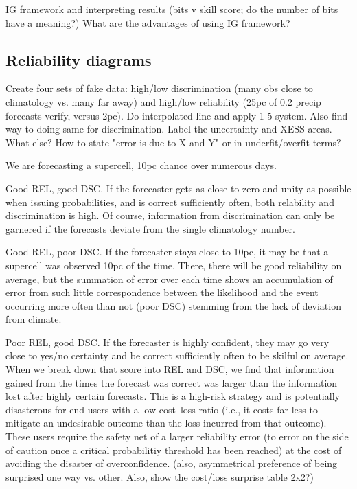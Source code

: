\documentclass[draft]{ametsoc}
\begin{document}
IG framework and interpreting results (bits v skill score; do the number of bits have a meaning?) What are the advantages of using IG framework? 

\subsection{Reliability diagrams}
Create four sets of fake data: high/low discrimination (many obs close to climatology vs. many far away) and high/low reliability (25pc of 0.2 precip forecasts verify, versus 2pc). Do interpolated line and apply 1-5 system. Also find way to doing same for discrimination. Label the uncertainty and XESS areas. What else? How to state "error is due to X and Y" or in underfit/overfit terms?

We are forecasting a supercell, 10pc chance over numerous days. 

Good REL, good DSC. If the forecaster gets as close to zero and unity as possible when issuing probabilities, and is correct sufficiently often, both relability and discrimination is high. Of course, information from discrimination can only be garnered if the forecasts deviate from the single climatology number.

Good REL, poor DSC. If the forecaster stays close to 10pc, it may be that a supercell was observed 10pc of the time. There, there will be good reliability on average, but the summation of error over each time shows an accumulation of error from such little correspondence between the likelihood and the event occurring more often than not (poor DSC) stemming from the lack of deviation from climate.

Poor REL, good DSC. If the forecaster is highly confident, they may go very close to yes/no certainty and be correct sufficiently often to be skilful on average. When we break down that score into REL and DSC, we find that information gained from the times the forecast was correct was larger than the information lost after highly certain forecasts. This is a high-risk strategy and is potentially disasterous for end-users with a low cost--loss ratio (i.e., it costs far less to mitigate an undesirable outcome than the loss incurred from that outcome). These users require the safety net of a larger reliability error (to error on the side of caution once a critical probabilitiy threshold has been reached) at the cost of avoiding the disaster of overconfidence. (also, asymmetrical preference of being surprised one way vs. other. Also, show the cost/loss surprise table 2x2?)
\end{document}
